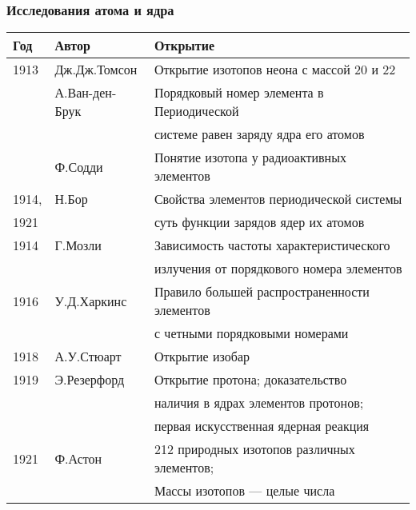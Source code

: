 \begin{frame}
	\frametitle{Исследования атома и ядра}
{\small	
	\begin{tabular}{l|l|l}
		Год & Автор	& Открытие \\
		\hline
		1913 & Дж.Дж.Томсон & Открытие {\color{red}изотопов} неона с массой 20 и 22\\
		~ & А.Ван-ден-Брук & {\color{red}Порядковый номер элемента в Периодической}  \\
		~ & ~ &  {\color{red}системе равен заряду ядра его 	атомов} \\
		~ & Ф.Содди & Понятие изотопа у радиоактивных
		элементов   \\
		1914, & Н.Бор & Свойства элементов периодической системы  \\
		1921 & ~ & суть  функции зарядов ядер их атомов \\
		1914 & Г.Мозли & Зависимость  частоты характеристического	  \\
		~ & ~ & излучения от порядкового номера элементов \\
		1916 & У.Д.Харкинс & {\color{red}Правило большей распространенности элементов}\\
		~ & ~ & {\color{red}с четными порядковыми номерами} \\
		1918 & А.У.Стюарт  &  Открытие {\color{red}изобар}\\
		1919 &Э.Резерфорд &   Открытие протона; доказательство  \\
		~ & ~ & наличия в ядрах элементов протонов; \\
		~ & ~ & первая искусственная ядерная реакция \\
		1921 & Ф.Астон  & {\color{red}212 природных изотопов различных элементов;} \\
		~ & ~ &   {\color{red}Массы изотопов --- целые числа} \\
		\hline
	\end{tabular}
}	
\end{frame}


